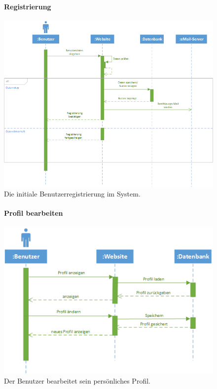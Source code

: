 \documentclass[12pt,a4paper]{article}
\begin{document}
\begin{figure}[H]
	\centering
	\paragraph{Registrierung}
	\includegraphics[width=\textwidth]{Bilder/Sequenzdiagramme/Registrieren.png}
	\caption{Die initiale Benutzerregistrierung im System.}
	\label{SzRegistrieren}
\end{figure}
\begin{figure}[H]
	\centering
	\paragraph{Profil bearbeiten}
	\includegraphics[width=\textwidth]{Bilder/Sequenzdiagramme/ProfilBearbeiten.png}
	\caption{Der Benutzer bearbeitet sein persönliches Profil.}
	\label{SzProfilBearbeiten}
\end{figure}
\end{document}
